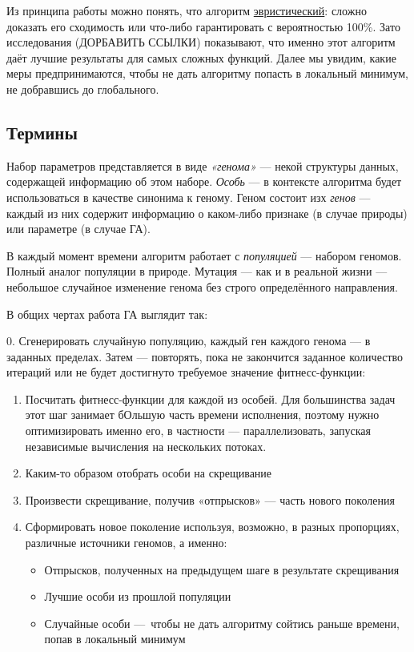 \documentclass[11pt]{article}
\begin{document}
    Из принципа работы можно понять, что алгоритм \href{https://en.wikipedia.org/wiki/Heuristic_(computer_science)}{эвристический}: сложно доказать его сходимость или что-либо гарантировать с вероятностью 100\%.
    Зато исследования (ДОРБАВИТЬ ССЫЛКИ) показывают, что именно этот алгоритм даёт лучшие результаты для самых сложных функций.
    Далее мы увидим, какие меры предпринимаются, чтобы не дать алгоритму попасть в локальный минимум, не добравшись до глобального.

    \subsection{Термины}
    Набор параметров представляется в виде \textit{«генома»} — некой структуры данных, содержащей информацию об этом наборе.
    \textit{Особь} — в контексте алгоритма будет использоваться в качестве синонима к геному.
    Геном состоит изх \textit{генов} — каждый из них содержит информацию о каком-либо признаке (в случае природы) или параметре (в случае ГА).

    В каждый момент времени алгоритм работает с \textit{популяцией} — набором геномов. Полный аналог популяции в природе.
    Мутация — как и в реальной жизни — небольшое случайное изменение генома без строго определённого направления.

    В общих чертах работа ГА выглядит так:

    0. Сгенерировать случайную популяцию, каждый ген каждого генома — в заданных пределах.
    Затем — повторять, пока не закончится заданное количество итераций или не будет достигнуто требуемое значение фитнесс-функции:
    \begin{enumerate}
        \item Посчитать фитнесс-функции для каждой из особей.
        Для большинства задач этот шаг занимает бОльшую часть времени исполнения, поэтому нужно оптимизировать именно его, в частности — параллелизовать, запуская независимые вычисления на нескольких потоках.
        \item Каким-то образом отобрать особи на скрещивание
        \item Произвести скрещивание, получив «отпрысков» — часть нового поколения
        \item Сформировать новое поколение используя, возможно, в разных пропорциях, различные источники геномов, а именно:
                \begin{itemize}
                    \item Отпрысков, полученных на предыдущем шаге в результате скрещивания
                    \item Лучшие особи из прошлой популяции
                    \item Случайные особи — чтобы не дать алгоритму сойтись раньше времени, попав в локальный минимум
                \end{itemize}
    \end{enumerate}
\end{document}
